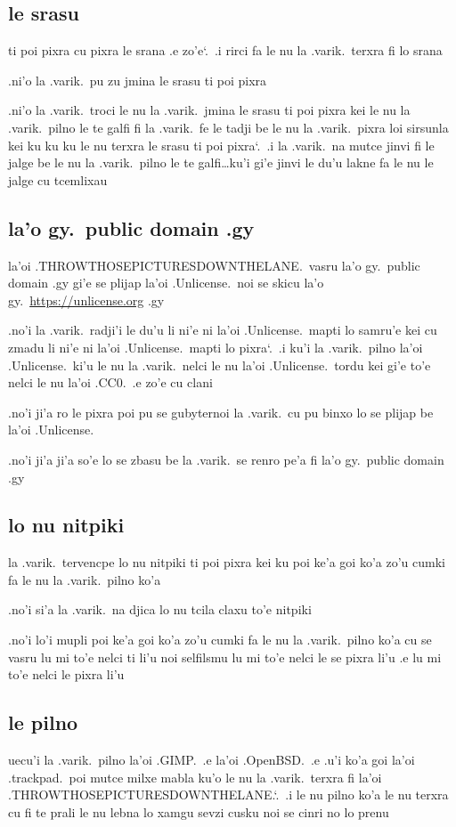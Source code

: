 \documentclass{report}
\newcommand\sds{\spacefactor\sfcode`.\ \space}
\begin{document}
\subsection{le srasu}
ti poi pixra cu pixra le srana .e zo'e\sds  .i rirci fa le nu la .varik.\ terxra fi lo srana

.ni'o la .varik.\ pu zu jmina le srasu ti poi pixra

.ni'o la .varik.\ troci le nu la .varik.\ jmina le srasu ti poi pixra kei le nu la .varik.\ pilno le te galfi fi la .varik.\ fe le tadji be le nu la .varik.\ pixra loi sirsunla kei ku ku ku le nu terxra le srasu ti poi pixra\sds  .i la .varik.\ na mutce jinvi fi le jalge be le nu la .varik.\ pilno le te galfi\ldots ku'i gi'e jinvi le du'u lakne fa le nu le jalge cu tcemlixau

\subsection{la'o gy.\ public domain .gy}
la'oi .THROWTHOSEPICTURESDOWNTHELANE.\ vasru la'o gy.\ public domain .gy gi'e se plijap la'oi .Unlicense.\ noi se skicu la'o gy.\ \url{https://unlicense.org} .gy

.no'i la .varik.\ radji'i le du'u li ni'e ni la'oi .Unlicense.\ mapti lo samru'e kei cu zmadu li ni'e ni la'oi .Unlicense.\ mapti lo pixra\sds  .i ku'i la .varik.\ pilno la'oi .Unlicense.\ ki'u le nu la .varik.\ nelci le nu la'oi .Unlicense.\ tordu kei gi'e to'e nelci le nu la'oi .CC0.\ .e zo'e cu clani

.no'i ji'a ro le pixra poi pu se gubyternoi la .varik.\ cu pu binxo lo se plijap be la'oi .Unlicense.

.no'i ji'a ji'a so'e lo se zbasu be la .varik.\ se renro pe'a fi la'o gy.\ public domain .gy

\subsection{lo nu nitpiki}
la .varik.\ tervencpe lo nu nitpiki ti poi pixra kei ku poi ke'a goi ko'a zo'u cumki fa le nu la .varik.\ pilno ko'a

.no'i si'a la .varik.\ na djica lo nu tcila claxu to'e nitpiki

.no'i lo'i mupli poi ke'a goi ko'a zo'u cumki fa le nu la .varik.\ pilno ko'a cu se vasru lu mi to'e nelci ti li'u noi selfilsmu lu mi to'e nelci le se pixra li'u .e lu mi to'e nelci le pixra li'u

\subsection{le pilno}
uecu'i la .varik.\ pilno la'oi .GIMP.\ .e la'oi .OpenBSD.\ .e .u'i ko'a goi la'oi .trackpad.\ poi mutce milxe mabla ku'o le nu la .varik.\ terxra fi la'oi .THROWTHOSEPICTURESDOWNTHELANE.\sds  .i le nu pilno ko'a le nu terxra cu fi te prali le nu lebna lo xamgu sevzi cusku noi se cinri no lo prenu
\end{document}

